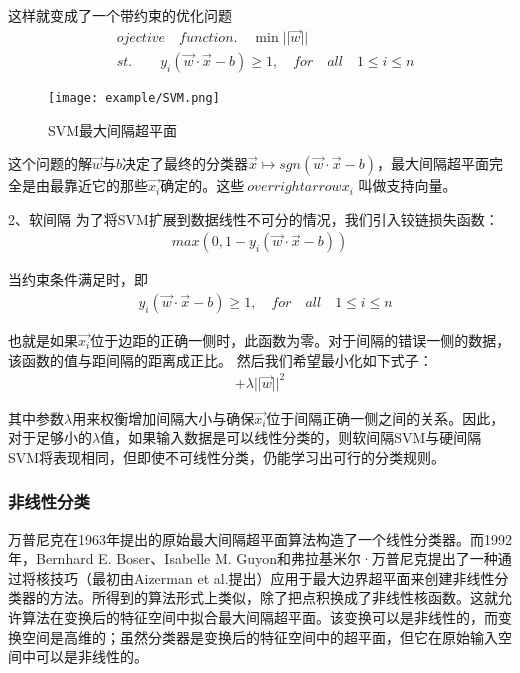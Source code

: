 这样就变成了一个带约束的优化问题
\begin{align}
& ojective \quad function. \quad \min ||\overrightarrow{w}|| \\
& st. \quad \quad y_i (\overrightarrow{w} \cdot \overrightarrow{x} - b) \geq 1, \quad  for \quad all \quad 1 \leq i \leq n
\end{align}

\begin{figure}[!htp]
\centering
\texttt{[image: example/SVM.png]}
\caption{SVM最大间隔超平面}
\label{fig1:3-8}
\end{figure}

这个问题的解$\overrightarrow{w}$与$b$决定了最终的分类器$\overrightarrow{x} \mapsto sgn(\overrightarrow{w} \cdot \overrightarrow{x} - b)$，最大间隔超平面完全是由最靠近它的那些$\overrightarrow{x_i}$确定的。这些$\ overrightarrow{x_i}$ 叫做支持向量。

2、软间隔
为了将SVM扩展到数据线性不可分的情况，我们引入铰链损失函数：
\begin{align}
max(0,1 - y_i (\overrightarrow{w} \cdot \overrightarrow{x} - b))
\end{align}

当约束条件满足时，即
\begin{align}
& y_i (\overrightarrow{w} \cdot \overrightarrow{x} - b) \geq 1, \quad for \quad all \quad 1 \leq i \leq n
\end{align}

也就是如果$\overrightarrow{x_i}$位于边距的正确一侧时，此函数为零。对于间隔的错误一侧的数据，该函数的值与距间隔的距离成正比。 然后我们希望最小化如下式子：
\begin{align}
[\frac{1}{n} \sum_{i=1}^n max(0,1 - y_i (\overrightarrow{w} \cdot \overrightarrow{x} - b))] + \lambda||\overrightarrow{w}||^2
\end{align}

其中参数$\lambda$用来权衡增加间隔大小与确保$\overrightarrow{x_i}$位于间隔正确一侧之间的关系。因此，对于足够小的$\lambda$值，如果输入数据是可以线性分类的，则软间隔SVM与硬间隔SVM将表现相同，但即使不可线性分类，仍能学习出可行的分类规则。

\subsubsection{非线性分类}

万普尼克在1963年提出的原始最大间隔超平面算法构造了一个线性分类器。而1992年，Bernhard E. Boser、Isabelle M. Guyon和弗拉基米尔·万普尼克提出了一种通过将核技巧（最初由Aizerman et al.提出）应用于最大边界超平面来创建非线性分类器的方法。所得到的算法形式上类似，除了把点积换成了非线性核函数。这就允许算法在变换后的特征空间中拟合最大间隔超平面。该变换可以是非线性的，而变换空间是高维的；虽然分类器是变换后的特征空间中的超平面，但它在原始输入空间中可以是非线性的。

